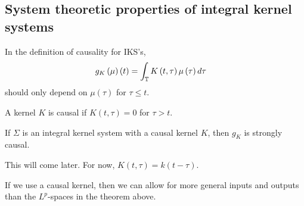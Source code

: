 \subsection{System theoretic properties of integral kernel systems}

In the definition of causality for IKS's, 
\begin{align*}
	g_K \left( \mu \right) \left( t \right) &= \int_{\mathbb{T} }^{ } K\left( t, \tau \right) \mu\left( \tau \right) d \tau  
\end{align*}
should only depend on $\mu\left( \tau \right) $ for $\tau \le  t$.

\begin{definition}
	A kernel $K$ is causal if $K\left( t, \tau \right) = 0$ for $\tau > t$.
\end{definition}
\begin{theorem}
	If $\Sigma$ is an integral kernel system with a causal kernel $K$, then $g_K$ is strongly causal.
\end{theorem}

\begin{definition} 
	This will come later. For now, $K\left( t, \tau \right) = k \left( t - \tau \right) $.
\end{definition}

If we use a causal kernel, then we can allow for more general inputs and outputs than the $L^{p}$-spaces in the theorem above.

